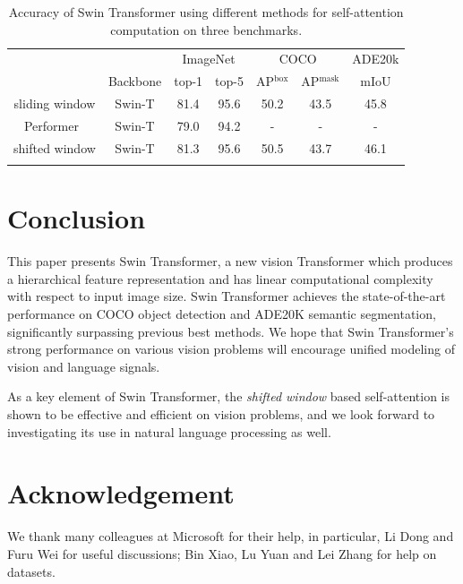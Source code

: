 \documentclass[10pt,twocolumn,letterpaper]{article}
\begin{document}
\begin{table}[]
\small
\centering
\addtolength{\tabcolsep}{-4.5pt}
\begin{tabular}{c|c|cc|cc|c}
\Xhline{1.0pt}
& & \multicolumn{2}{c|}{ImageNet} & \multicolumn{2}{c|}{COCO} & \multicolumn{1}{c}{ADE20k} \\
& Backbone & top-1 & top-5  & AP$^\text{box}$ & AP$^\text{mask}$ & mIoU \\
\hline
sliding window & Swin-T & 81.4 & 95.6& 50.2 & 43.5 & 45.8 \\
Performer~\cite{choromanski2020performer} & Swin-T & 79.0 & 94.2 & - & - & -\\
\hline
shifted window & Swin-T & 81.3 & 95.6 & 50.5 & 43.7 & 46.1 \\
\Xhline{1.0pt}
\end{tabular}
\caption{Accuracy of Swin Transformer using different methods for self-attention computation on three benchmarks.}
\label{exp:abaltion-selfatt-acc}
\normalsize
\vspace{-.5em}
\end{table}

\section{Conclusion}

This paper presents Swin Transformer, a new vision Transformer which produces a hierarchical feature representation and has linear computational complexity with respect to input image size. Swin Transformer achieves the state-of-the-art performance on COCO object detection and ADE20K semantic segmentation, significantly surpassing previous best methods. We hope that Swin Transformer’s strong performance on various vision problems will encourage unified modeling of vision and language signals.

As a key element of Swin Transformer, the \emph{shifted window} based self-attention is shown to be effective and efficient on vision problems, and we look forward to investigating its use in natural language processing as well.

\section*{Acknowledgement}

We thank many colleagues at Microsoft for their help, in particular, Li Dong and Furu Wei for useful discussions; Bin Xiao, Lu Yuan and Lei Zhang for help on datasets.
\end{document}
